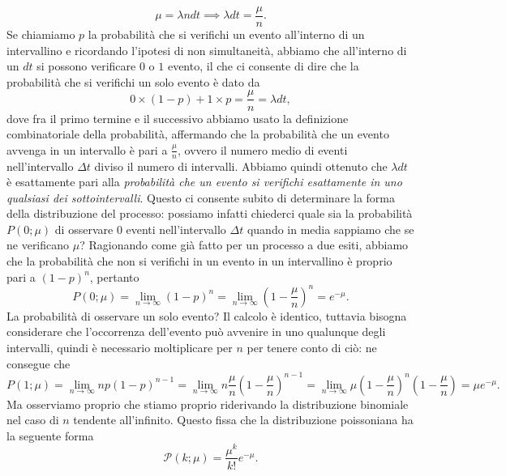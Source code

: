 \documentclass{report}
\begin{document}
$$\mu = \lambda n dt \implies \lambda dt = \frac{\mu}{n}.$$
Se chiamiamo $p$ la probabilità che si verifichi un evento all'interno di un intervallino e ricordando l'ipotesi di non simultaneità, abbiamo che all'interno di un $dt$ si possono verificare $0$ o $1$ evento, il che ci consente di dire che la probabilità che si verifichi un solo evento è dato da
$$
0 \times (1-p) + 1 \times p = \frac{\mu}{n} = \lambda dt,
$$
dove fra il primo termine e il successivo abbiamo usato la definizione combinatoriale della probabilità, affermando che la probabilità che un evento avvenga in un intervallo è pari a $\frac{\mu}{n}$, ovvero il numero medio di eventi nell'intervallo $\Delta t$ diviso il numero di intervalli. Abbiamo quindi ottenuto che $\lambda dt$ è esattamente pari alla \emph{probabilità che un evento si verifichi esattamente in uno qualsiasi dei sottointervalli}. Questo ci consente subito di determinare la forma della distribuzione del processo: possiamo infatti chiederci quale sia la probabilità $P(0; \mu)$ di osservare $0$ eventi nell'intervallo $\Delta t$ quando in media sappiamo che se ne verificano $\mu$? Ragionando come già fatto per un processo a due esiti, abbiamo che la probabilità che non si verifichi in un evento in un intervallino è proprio pari a $(1-p)^n$, pertanto
$$
	P(0; \mu) = \lim_{n \to \infty} (1 - p)^n = \lim_{n \to \infty} (1 - \frac{\mu}{n})^n = e^{-\mu}. 
$$
La probabilità di osservare un solo evento? Il calcolo è identico, tuttavia bisogna considerare che l'occorrenza dell'evento può avvenire in uno qualunque degli intervalli, quindi è necessario moltiplicare per $n$ per tenere conto di ciò: ne consegue che
$$
	P(1; \mu) = \lim_{n \to \infty} np(1-p)^{n-1} = \lim_{n \to \infty} n \frac{\mu}{n} (1 - \frac{\mu}{n})^{n-1} = \lim_{n \to \infty} \mu (1 - \frac{\mu}{n})^n (1 - \frac{\mu}{n}) = \mu e^{-\mu}.
$$
Ma osserviamo proprio che stiamo proprio riderivando la distribuzione binomiale nel caso di $n$ tendente all'infinito. Questo fissa che la distribuzione poissoniana ha la seguente forma
\begin{equation}
	\mathcal{P}(k; \mu) = \frac{\mu^k}{k!} e^{-\mu}.
	\label{eq:poisson_fin}
\end{equation}
\end{document}
